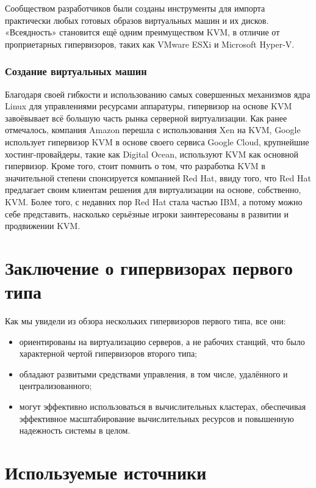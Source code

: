 \documentclass[14pt, a4paper]{article}
\begin{document}
Сообществом разработчиков были созданы инструменты для импорта практически любых готовых
образов виртуальных машин и их дисков. «Всеядность» становится ещё одним преимуществом KVM,
в отличие от проприетарных гипервизоров, таких как VMware ESXi и Microsoft Hyper-V.

\subsubsection*{Создание виртуальных машин}

Благодаря своей гибкости и использованию самых совершенных механизмов ядра Linux для
управлениями ресурсами аппаратуры, гипервизор на основе KVM завоёвывает всё большую часть
рынка серверной виртуализации. Как ранее отмечалось, компания Amazon перешла с использования
Xen на KVM, Google использует гипервизор KVM в основе своего сервиса Google Cloud, крупнейшие
хостинг-провайдеры, такие как Digital Ocean, используют KVM как основной гипервизор. Кроме того,
стоит помнить о том, что разработка KVM в значительной степени спонсируется компанией Red Hat,
ввиду того, что Red Hat предлагает своим клиентам решения для виртуализации на основе,
собственно, KVM. Более того, с недавних пор Red Hat стала частью IBM, а потому можно себе
представить, насколько серьёзные игроки заинтересованы в развитии и продвижении KVM.\newpage

\section*{Заключение о гипервизорах первого типа}

Как мы увидели из обзора нескольких гипервизоров первого типа, все они:
\begin{itemize}
    \item ориентированы на виртуализацию серверов, а не рабочих станций, что было характерной
    чертой гипервизоров второго типа;
    \item обладают развитыми средствами управления, в том числе, удалённого и централизованного;
    \item могут эффективно использоваться в вычислительных кластерах, обеспечивая эффективное
    масштабирование вычислительных ресурсов и повышенную надежность системы в целом.
\end{itemize}

\section*{Используемые источники}
\end{document}
